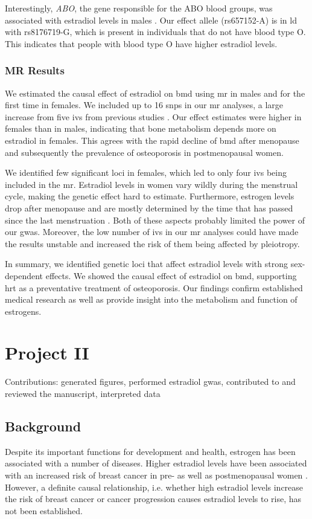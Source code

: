 \documentclass[twoside=false]{scrbook}
\begin{document}
Interestingly, \textit{ABO}, the gene responsible for the ABO blood groups, was associated with estradiol levels in males \cite{Ogasawara1996}.
Our effect allele (rs657152-A) is in \gls{ld} with rs8176719-G, which is present in individuals that do not have blood type O.
This indicates that people with blood type O have higher estradiol levels.

\subsection{MR Results}
We estimated the causal effect of estradiol on \gls{bmd} using \gls{mr} in males and for the first time in females.
We included up to 16 \glspl{snp} in our \gls{mr} analyses, a large increase from five \glspl{iv} from previous studies \cite{Nethander2018a}.
Our effect estimates were higher in females than in males, indicating that bone metabolism depends more on estradiol in females.
This agrees with the rapid decline of \gls{bmd} after menopause and subsequently the prevalence of osteoporosis in postmenopausal women.

We identified few significant loci in females, which led to only four \glspl{iv} being included in the \gls{mr}.
Estradiol levels in women vary wildly during the menstrual cycle, making the genetic effect hard to estimate.
Furthermore, estrogen levels drop after menopause and are mostly determined by the time that has passed since the last menstruation \cite{Richardson2020}.
Both of these aspects probably limited the power of our \gls{gwas}.
Moreover, the low number of \glspl{iv} in our \gls{mr} analyses could have made the results unstable and increased the risk of them being affected by pleiotropy.

In summary, we identified genetic loci that affect estradiol levels with strong sex-dependent effects.
We showed the causal effect of estradiol on \gls{bmd}, supporting \gls{hrt} as a preventative treatment of osteoporosis.
Our findings confirm established medical research as well as provide insight into the metabolism and function of estrogens.

\chapter{Project II}
{
    \parindent 0pt \color{gray}
    Contributions: generated figures, performed estradiol \gls{gwas}, contributed to and reviewed the manuscript, interpreted data
}

\section{Background}
Despite its important functions for development and health, estrogen has been associated with a number of diseases.
Higher estradiol levels have been associated with an increased risk of breast cancer in pre- as well as postmenopausal women \cite{Key2013,Kaaks2005,Zhang2013,Kaaks2005a}.
However, a definite causal relationship, i.e. whether high estradiol levels increase the risk of breast cancer or cancer progression causes estradiol levels to rise, has not been established.
\end{document}
